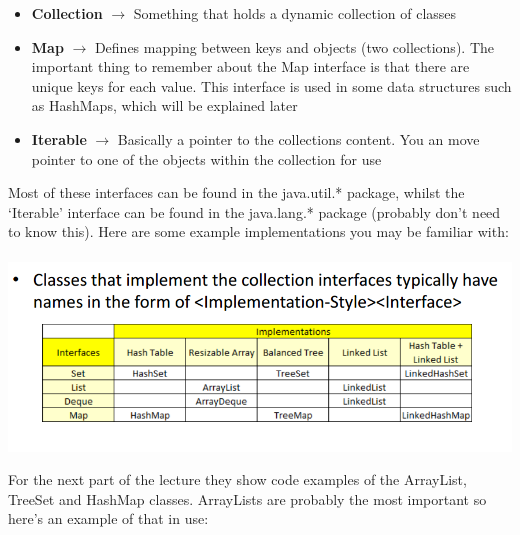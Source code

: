 \documentclass{article}
\begin{document}
\begin{itemize}
    \item \textbf{Collection} $\longrightarrow$ Something that holds a dynamic collection of classes
    \item \textbf{Map} $\longrightarrow$ Defines mapping between keys and objects (two collections). The important thing to remember about the Map interface is that there are unique keys for each value. This interface is used in some data structures such as HashMaps, which will be explained later
    \item \textbf{Iterable} $\longrightarrow$ Basically a pointer to the collections content. You an move pointer to one of the objects within the collection for use
\end{itemize}

Most of these interfaces can be found in the java.util.* package, whilst the `Iterable' interface can be found in the java.lang.* package (probably don't need to know this). Here are some example implementations you may be familiar with:
\\\\
\includegraphics[scale = 0.65]{jcfImplementations}
\newpage

For the next part of the lecture they show code examples of the ArrayList, TreeSet and HashMap classes. ArrayLists are probably the most important so here's an example of that in use:
\end{document}
